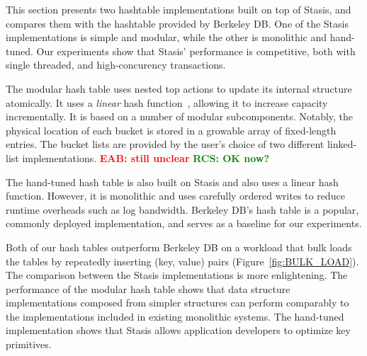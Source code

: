 \documentclass[letterpaper,twocolumn,10pt]{article}
\newcommand{\yad}{Stasis\xspace}
\newcommand{\yads}{Stasis'\xspace}
\newcommand{\eab}[1]{\textcolor{red}{\bf EAB: #1}}
\newcommand{\rcs}[1]{\textcolor{green}{\bf RCS: #1}}
\begin{document}
This section presents two hashtable implementations built on top of
\yad, and compares them with the hashtable provided by Berkeley DB.
One of the \yad implementations is simple and modular, while
the other is monolithic and hand-tuned.  Our experiments show that
\yads performance is competitive, both with single threaded, and
high-concurency transactions.


The modular hash table uses nested top actions to update its internal
structure atomically.  It uses a {\em linear} hash
function~\cite{lht}, allowing it to increase capacity incrementally.
It is based on a number of modular subcomponents.  Notably, the
physical location of each bucket is stored in a growable array of
fixed-length entries.  The bucket lists are provided by the user's
choice of two different linked-list implementations. \eab{still
unclear} \rcs{OK now?}

The hand-tuned hash table is also built on \yad and also uses a linear hash
function.  However, it is monolithic and uses carefully ordered writes to
reduce runtime overheads such as log bandwidth.  Berkeley DB's
hash table is a popular, commonly deployed implementation, and serves
as a baseline for our experiments.

Both of our hash tables outperform Berkeley DB on a workload that bulk
loads the tables by repeatedly inserting (key, value) pairs
(Figure~\ref{fig:BULK_LOAD}).
The comparison between the \yad  implementations is more
enlightening.  The performance of the modular hash table shows that
data structure implementations composed from
simpler structures can perform comparably to the implementations included 
in existing monolithic systems.  The hand-tuned
implementation shows that \yad allows application developers to
optimize key primitives.
\end{document}

